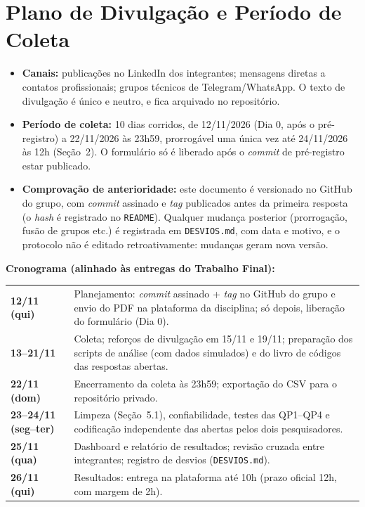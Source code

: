 \section{Plano de Divulgação e Período de Coleta}

\begin{itemize}
  \item \textbf{Canais:} publicações no LinkedIn dos integrantes; mensagens diretas a contatos profissionais; grupos técnicos de Telegram/WhatsApp. O texto de divulgação é único e neutro, e fica arquivado no repositório.
  \item \textbf{Período de coleta:} 10 dias corridos, de 12/11/2026 (Dia 0, após o pré-registro) a 22/11/2026 às 23h59, prorrogável uma única vez até 24/11/2026 às 12h (Seção~2). O formulário só é liberado após o \textit{commit} de pré-registro estar publicado.
  \item \textbf{Comprovação de anterioridade:} este documento é versionado no GitHub do grupo, com \textit{commit} assinado e \textit{tag} publicados antes da primeira resposta (o \textit{hash} é registrado no \texttt{README}). Qualquer mudança posterior (prorrogação, fusão de grupos etc.) é registrada em \texttt{DESVIOS.md}, com data e motivo, e o protocolo não é editado retroativamente: mudanças geram nova versão.
\end{itemize}

\textbf{Cronograma (alinhado às entregas do Trabalho Final):}

\vspace{2pt}
{\footnotesize
{}
\renewcommand{\arraystretch}{1.35}
\setlength{\tabcolsep}{5pt}
\noindent\begin{tabularx}{\textwidth}{|L{3.1cm}|Y|}
\hline
{}
 &  \\
\hline
\textbf{12/11 (qui)} & Planejamento: \textit{commit} assinado + \textit{tag} no GitHub do grupo e envio do PDF na plataforma da disciplina; só depois, liberação do formulário (Dia 0). \\ \hline
\textbf{13--21/11} & Coleta; reforços de divulgação em 15/11 e 19/11; preparação dos scripts de análise (com dados simulados) e do livro de códigos das respostas abertas. \\ \hline
\textbf{22/11 (dom)} & Encerramento da coleta às 23h59; exportação do CSV para o repositório privado. \\ \hline
\textbf{23--24/11 (seg--ter)} & Limpeza (Seção~5.1), confiabilidade, testes das QP1--QP4 e codificação independente das abertas pelos dois pesquisadores. \\ \hline
\textbf{25/11 (qua)} & Dashboard e relatório de resultados; revisão cruzada entre integrantes; registro de desvios (\texttt{DESVIOS.md}). \\ \hline
\textbf{26/11 (qui)} & Resultados: entrega na plataforma até 10h (prazo oficial 12h, com margem de 2h). \\ \hline
\end{tabularx}\par
{}
}
